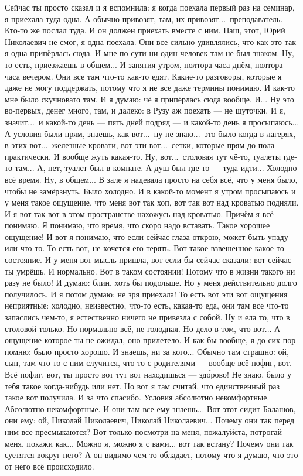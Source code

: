 \M
Сейчас ты просто сказал и я вспомнила: я когда поехала первый раз на семинар,
я приехала туда одна. А обычно привозят, там, их привозят...\
преподаватель. Кто-то же послал туда. И он должен приехать вместе с ним. Наш, этот,
Юрий Николаевич не смог, я одна поехала. Они все сильно удивлялись, что как это
так я одна припёрлась сюда.
И мне по сути ни один человек там не был знаком. Ну, то есть, приезжаешь в общем...
И занятия утром, полтора часа днём, полтора часа вечером. Они все там что-то как-то едят.
Какие-то разговоры, которые я даже не могу поддержать, потому что я не все даже термины понимаю.
И как-то мне было скучновато там. И я думаю: чё я припёрлась сюда вообще. И...
Ну это во-первых, денег много, там, и далеко: в Рузу аж поехать --- не шуточки.
И я, значит...\ и какой-то день --- пять дней подряд --- и какой-то день я просыпаюсь...
А условия были прям, знаешь, как вот...\ ну не знаю...\ это было когда в лагерях,
в этих вот...\ железные кровати, вот эти вот...\ сетки, которые прям до пола практически.
И вообще жуть какая-то.
Ну, вот...\ столовая тут чё-то, туалеты где-то там...
А, нет, туалет был в комнате.
А душ был где-то --- туда идти...
Холодно всё время.
Ну, в общем...
В зале я надевала просто на себя всё, что у меня было, чтобы не замёрзнуть. Было холодно.
И в какой-то момент я утром просыпаюсь и у меня такое ощущение, что
меня вот так хоп, вот так вот над кроватью подняли.
И я вот так вот в этом пространстве нахожусь над кроватью.
Причём я всё понимаю.
Я понимаю, что время, что скоро надо вставать.
Такое хорошее ощущение!
И вот я понимаю, что если сейчас глаза открою, может быть упаду или что-то.
То есть вот, не хочется его терять.
Вот такое взвешенное
какое-то состояние.
И у меня вот мысль пришла,
вот если бы сейчас сказали: вот сейчас ты умрёшь.
И нормально. Вот в таком состоянии!
Потому что в жизни такого ни разу не было!
И думаю: блин, хоть бы подольше.
Но у меня действительно долго получилось.
И я потом думаю: не зря приехала!
То есть вот эти вот ощущения неприятные:
холодно, неизвестно,
что-то есть, какая-то еда,
они там все что-то запаслись чем-то,
я естественно ничего не привезла с собой.
Ну и ела то, что в столовой только.
Но нормально всё, не голодная.
Но дело в том, что вот...
А ощущение которое ты не ожидал, оно прилетело.
И как бы вообще, я до сих пор помню: было просто хорошо.
И знаешь, ни за кого...
Обычно там страшно: ой, сын, там что-то с ним случится, что-то с родителями --- вообще всё пофиг,
вот.
Всё пофиг, вот, ты просто вот тут вот находишься --- зд\'орово!
Не знаю, было у тебя такое когда-нибудь или нет.
Но вот я там считай, что единственный раз такое вот получила.
И за что спасибо.
Условия абсолютно некомфортные.
Абсолютно некомфортные.
И они там все ему знаешь... Вот этот сидит Балашов, они ему: ой, Николай Николаевич,
Николай Николаевич...
Почему они так перед ним все пресмыкаются?
Вот только посмотри на меня, пожалуйста, потрогай меня, покажи как...
Можно я, можно я с вами... вот так встану?
Почему они так суетятся вокруг него?
А он видимо чем-то обладает, потому что я думаю, что
это от него всё происходило.

